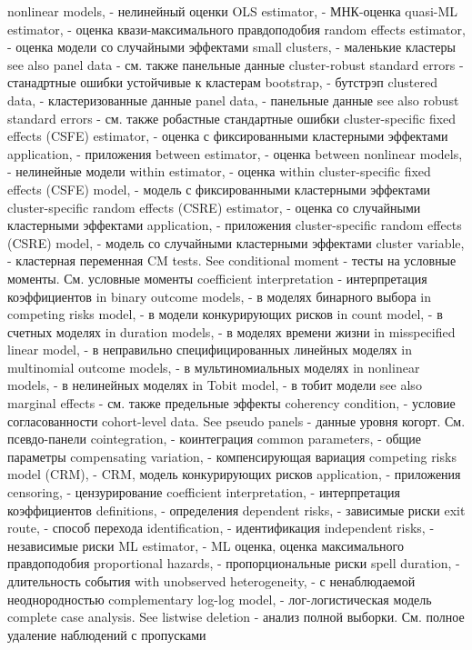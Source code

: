 nonlinear models, - нелинейный оценки
OLS estimator, - МНК-оценка
quasi-ML estimator, - оценка квази-максимального правдоподобия
random effects estimator, - оценка модели со случайными эффектами
small clusters, - маленькие кластеры
see also panel data - см. также панельные данные
cluster-robust standard errors - станадртные ошибки устойчивые к кластерам
bootstrap, - бутстрэп
clustered data, - кластеризованные данные
panel data, - панельные данные
see also robust standard errors - см. также робастные стандартные ошибки
cluster-specific fixed effects (CSFE) estimator, - оценка с фиксированными кластерными эффектами
application, - приложения
between estimator, - оценка between
nonlinear models, - нелинейные модели
within estimator, - оценка within
cluster-specific fixed effects (CSFE) model, - модель с фиксированными кластерными эффектами
cluster-specific random effects (CSRE) estimator, - оценка со случайными кластерными эффектами
application, - приложения
cluster-specific random effects (CSRE) model, - модель со случайными кластерными эффектами
cluster variable, - кластерная переменная
CM tests. See conditional moment - тесты на условные моменты. См. условные моменты
coefficient interpretation - интерпретация коэффициентов
in binary outcome models, - в моделях бинарного выбора
in competing risks model, - в модели конкурирующих рисков
in count model, - в счетных моделях
in duration models, - в моделях времени жизни
in misspecified linear model, - в неправильно специфицированных линейных моделях
in multinomial outcome models, - в мультиномиальных моделях
in nonlinear models, - в нелинейных моделях
in Tobit model, - в тобит модели
see also marginal effects - см. также предельные эффекты
coherency condition, - условие согласованности
cohort-level data. See pseudo panels - данные уровня когорт. См. псевдо-панели
cointegration, - коинтеграция
common parameters, - общие параметры
compensating variation, - компенсирующая вариация
competing risks model (CRM), - CRM, модель конкурирующих рисков
application, - приложения
censoring, - цензурирование
coefficient interpretation, - интерпретация коэффициентов
definitions, - определения
dependent risks, - зависимые риски
exit route, - способ перехода
identification, - идентификация
independent risks, - независимые риски
ML estimator, - ML оценка, оценка максимального правдоподобия
proportional hazards, - пропорциональные риски
spell duration, - длительность события
with unobserved heterogeneity,  - с ненаблюдаемой неоднородностью
complementary log-log model, - лог-логистическая модель
complete case analysis. See listwise deletion - анализ полной выборки. См. полное удаление наблюдений с пропусками
